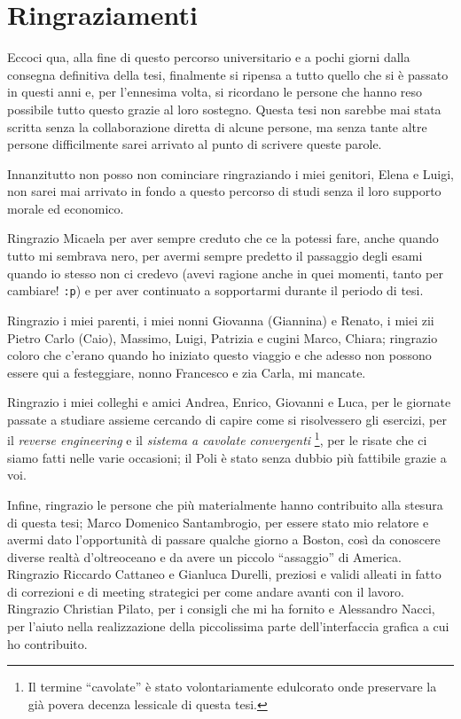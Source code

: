 \chapter*{Ringraziamenti}
Eccoci qua, alla fine di questo percorso universitario e a pochi giorni dalla consegna
definitiva della tesi, finalmente si ripensa a tutto quello che si \`e passato
in questi anni e, per l'ennesima volta, si ricordano le persone che hanno reso possibile tutto
questo grazie al loro sostegno.
Questa tesi non sarebbe mai stata scritta senza la collaborazione diretta di alcune
persone, ma senza tante altre persone difficilmente sarei arrivato al punto
di scrivere queste parole.

Innanzitutto non posso non cominciare ringraziando i miei genitori, Elena e Luigi,
non sarei mai arrivato in fondo a questo percorso di studi senza il loro supporto
morale ed economico.

Ringrazio Micaela per aver sempre creduto che ce la potessi fare, anche quando
tutto mi sembrava nero, per avermi sempre predetto il passaggio degli esami
quando io stesso non ci credevo (avevi ragione anche in quei momenti,
tanto per cambiare! \verb+:p+) e per aver continuato a sopportarmi durante il periodo
di tesi.

Ringrazio i miei parenti, i miei nonni Giovanna (Giannina) e Renato,
i miei zii Pietro Carlo (Caio), Massimo, Luigi, Patrizia e cugini Marco, Chiara;
ringrazio coloro che c'erano quando ho iniziato questo viaggio e che adesso
non possono essere qui a festeggiare, nonno Francesco e zia Carla, mi mancate.

Ringrazio i miei colleghi e amici Andrea, Enrico, Giovanni e Luca, per le giornate passate
a studiare assieme cercando di capire come si risolvessero gli esercizi,
per il \emph{reverse engineering} e il \emph{sistema a cavolate convergenti}
\footnote{Il termine ``cavolate'' \`e stato volontariamente edulcorato onde preservare
la gi\`a povera decenza lessicale di questa tesi.}, per le risate che ci siamo
fatti nelle varie occasioni; il Poli \`e stato senza dubbio pi\`u fattibile
grazie a voi.

Infine, ringrazio le persone che pi\`u materialmente hanno contribuito
alla stesura di questa tesi; Marco Domenico Santambrogio, per essere stato
mio relatore e avermi dato l'opportunit\`a di passare qualche giorno a
Boston, cos\`i da conoscere diverse realt\`a d'oltreoceano e da avere un piccolo
``assaggio'' di America. Ringrazio Riccardo Cattaneo e Gianluca Durelli, preziosi e validi
alleati in fatto di correzioni e di meeting strategici per come andare avanti con
il lavoro. Ringrazio Christian Pilato, per i consigli che mi ha fornito e Alessandro
Nacci, per l'aiuto nella realizzazione della piccolissima parte dell'interfaccia
grafica a cui ho contribuito.

